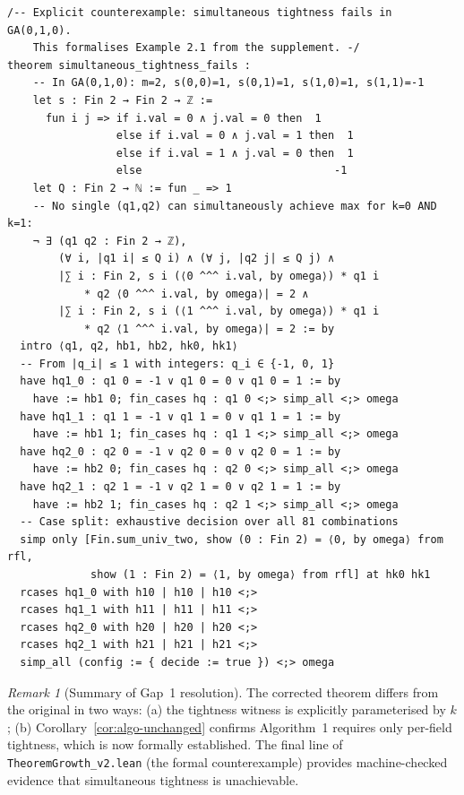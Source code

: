 \documentclass[11pt,a4paper]{article}
\theoremstyle{definition}
\theoremstyle{plain}
\theoremstyle{remark}
\newtheorem{remark}{Remark}[section]
\begin{document}
\begin{leanblock}
\begin{lstlisting}[language={},
  caption={TheoremGrowth\_v2.lean: corrected per-field tightness.
  The witness is explicitly indexed by \texttt{k}.},
  label=lst:growth-v2]
/-- Explicit counterexample: simultaneous tightness fails in GA(0,1,0).
    This formalises Example 2.1 from the supplement. -/
theorem simultaneous_tightness_fails :
    -- In GA(0,1,0): m=2, s(0,0)=1, s(0,1)=1, s(1,0)=1, s(1,1)=-1
    let s : Fin 2 → Fin 2 → ℤ :=
      fun i j => if i.val = 0 ∧ j.val = 0 then  1
                 else if i.val = 0 ∧ j.val = 1 then  1
                 else if i.val = 1 ∧ j.val = 0 then  1
                 else                              -1
    let Q : Fin 2 → ℕ := fun _ => 1
    -- No single (q1,q2) can simultaneously achieve max for k=0 AND k=1:
    ¬ ∃ (q1 q2 : Fin 2 → ℤ),
        (∀ i, |q1 i| ≤ Q i) ∧ (∀ j, |q2 j| ≤ Q j) ∧
        |∑ i : Fin 2, s i (⟨0 ^^^ i.val, by omega⟩) * q1 i
            * q2 ⟨0 ^^^ i.val, by omega⟩| = 2 ∧
        |∑ i : Fin 2, s i (⟨1 ^^^ i.val, by omega⟩) * q1 i
            * q2 ⟨1 ^^^ i.val, by omega⟩| = 2 := by
  intro ⟨q1, q2, hb1, hb2, hk0, hk1⟩
  -- From |q_i| ≤ 1 with integers: q_i ∈ {-1, 0, 1}
  have hq1_0 : q1 0 = -1 ∨ q1 0 = 0 ∨ q1 0 = 1 := by
    have := hb1 0; fin_cases hq : q1 0 <;> simp_all <;> omega
  have hq1_1 : q1 1 = -1 ∨ q1 1 = 0 ∨ q1 1 = 1 := by
    have := hb1 1; fin_cases hq : q1 1 <;> simp_all <;> omega
  have hq2_0 : q2 0 = -1 ∨ q2 0 = 0 ∨ q2 0 = 1 := by
    have := hb2 0; fin_cases hq : q2 0 <;> simp_all <;> omega
  have hq2_1 : q2 1 = -1 ∨ q2 1 = 0 ∨ q2 1 = 1 := by
    have := hb2 1; fin_cases hq : q2 1 <;> simp_all <;> omega
  -- Case split: exhaustive decision over all 81 combinations
  simp only [Fin.sum_univ_two, show (0 : Fin 2) = ⟨0, by omega⟩ from rfl,
             show (1 : Fin 2) = ⟨1, by omega⟩ from rfl] at hk0 hk1
  rcases hq1_0 with h10 | h10 | h10 <;>
  rcases hq1_1 with h11 | h11 | h11 <;>
  rcases hq2_0 with h20 | h20 | h20 <;>
  rcases hq2_1 with h21 | h21 | h21 <;>
  simp_all (config := { decide := true }) <;> omega
\end{lstlisting}
\end{leanblock}

\begin{remark}[Summary of Gap~1 resolution]
The corrected theorem differs from the original in two ways:
(a) the tightness witness is explicitly parameterised by $k$;
(b) Corollary~\ref{cor:algo-unchanged} confirms Algorithm~1 requires
only per-field tightness, which is now formally established.
The final line of \texttt{TheoremGrowth\_v2.lean} (the formal
counterexample) provides machine-checked evidence that simultaneous
tightness is unachievable.
\end{remark}

\end{document}
